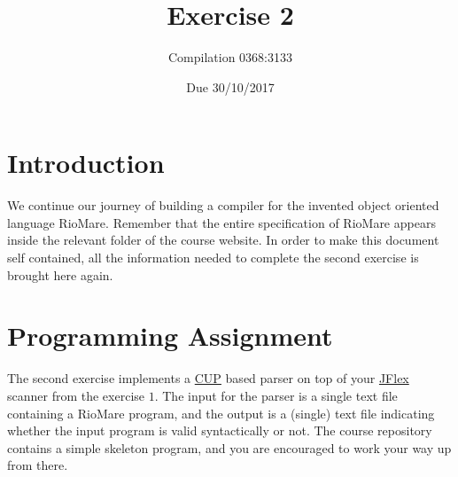 \documentclass{article}
\begin{document}
\title{Exercise 2}
\author{Compilation 0368:3133}
\date{Due 30/10/2017}
\maketitle

\section{Introduction}
We continue our journey of building a compiler
for the invented object oriented language RioMare.
Remember that the entire specification of RioMare appears
inside the relevant folder of the course website.
In order to make this document self contained,
all the information needed to complete the second exercise is brought here again.

\section{Programming Assignment}
The second exercise implements a \href{http://www2.cs.tum.edu/projects/cup/}{CUP} based
parser on top of your \href{http://jflex.de/}{JFlex} scanner from the exercise $1$.
The input for the parser is a single text file containing a RioMare program,
and the output is a (single) text file indicating whether the input program
is valid syntactically or not.
The course repository contains a simple skeleton program,
and you are encouraged to work your way up from there.
\end{document}
